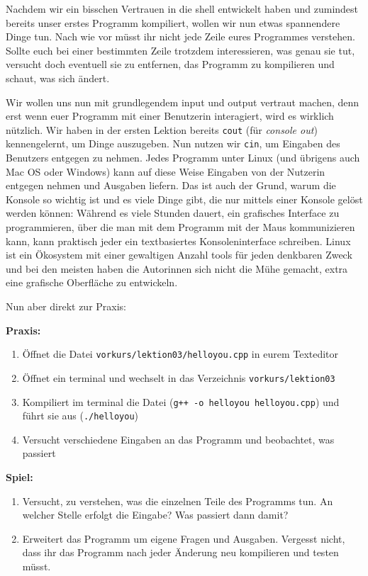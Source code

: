
Nachdem wir ein bisschen Vertrauen in die shell entwickelt haben und zumindest
bereits unser erstes Programm kompiliert, wollen wir nun etwas spannendere
Dinge tun. Nach wie vor müsst ihr nicht jede Zeile eures Programmes verstehen.
Sollte euch bei einer bestimmten Zeile trotzdem interessieren, was genau sie
tut, versucht doch eventuell sie zu entfernen, das Programm zu kompilieren und
schaut, was sich ändert.

Wir wollen uns nun mit grundlegendem input und output vertraut machen, denn
erst wenn euer Programm mit einer Benutzerin interagiert, wird es wirklich
nützlich. Wir haben in der ersten Lektion bereits \texttt{cout} (für
\emph{console out}) kennengelernt, um Dinge auszugeben. Nun nutzen wir
\texttt{cin}, um Eingaben des Benutzers entgegen zu nehmen. Jedes Programm
unter Linux (und übrigens auch Mac OS oder Windows) kann auf diese Weise
Eingaben von der Nutzerin entgegen nehmen und Ausgaben liefern. Das ist auch
der Grund, warum die Konsole so wichtig ist und es viele Dinge gibt, die nur
mittels einer Konsole gelöst werden können: Während es viele Stunden dauert,
ein grafisches Interface zu programmieren, über die man mit dem Programm mit
der Maus kommunizieren kann, kann praktisch jeder ein textbasiertes
Konsoleninterface schreiben. Linux ist ein Ökosystem mit einer gewaltigen
Anzahl tools für jeden denkbaren Zweck und bei den meisten haben die Autorinnen
sich nicht die Mühe gemacht, extra eine grafische Oberfläche zu entwickeln.

Nun aber direkt zur Praxis:

\textbf{Praxis:}
\begin{enumerate}
    \item Öffnet die Datei \texttt{vorkurs/lektion03/helloyou.cpp} in eurem Texteditor
    \item Öffnet ein \Gls{terminal} und wechselt in das Verzeichnis \texttt{vorkurs/lektion03}
    \item Kompiliert im \Gls{terminal} die Datei (\texttt{g++ -o helloyou
              helloyou.cpp}) und führt sie aus (\texttt{./helloyou})
    \item Versucht verschiedene Eingaben an das Programm und beobachtet, was passiert
\end{enumerate}


\textbf{Spiel:}

\begin{enumerate}
    \item Versucht, zu verstehen, was die einzelnen Teile des Programms tun. An
          welcher Stelle erfolgt die Eingabe? Was passiert dann damit?
    \item Erweitert das Programm um eigene Fragen und Ausgaben. Vergesst nicht,
          dass ihr das Programm nach jeder Änderung neu kompilieren und testen
          müsst.
\end{enumerate}

